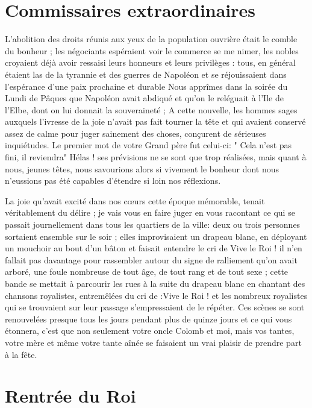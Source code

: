 \documentclass[11pt,a4paper]{report}
\begin{document}
\section*{Commissaires extraordinaires}

L'abolition des droits réunis aux yeux de la population ouvrière était le comble du bonheur ; les négociants espéraient voir le commerce se me nimer, les nobles croyaient déjà avoir ressaisi leurs honneurs et leurs privilèges : tous, en général étaient las de la tyrannie et des guerres de Napoléon et se réjouissaient dans l'espérance d'une paix prochaine et durable Nous apprîmes dans la soirée du Lundi de Pâques que Napoléon avait abdiqué et qu'on le reléguait à l'Ile de l'Elbe, dont on lui donnait la souveraineté ; A cette nouvelle, les hommes sages auxquels l'ivresse de la joie n'avait pas fait tourner la tête et qui avaient conservé assez de calme pour juger sainement des choses, conçurent de sérieuses inquiétudes. Le premier mot de votre Grand père fut celui-ci: " Cela n'est pas fini, il reviendra" Hélas ! ses prévisions ne se sont que trop réalisées, mais quant à nous, jeunes têtes, nous savourions alors si vivement le bonheur dont nous n'eussions pas été capables d'étendre si loin nos réflexions.

La joie qu'avait excité dans nos cœurs cette époque mémorable, tenait véritablement du délire ; je vais vous en faire juger en vous racontant ce qui se passait journellement dans tous les quartiers de la ville: deux ou trois personnes sortaient ensemble sur le soir ; elles improvisaient un drapeau blanc, en déployant un mouchoir au bout d'un bâton et faisait entendre le cri de Vive le Roi ! il n'en fallait pas davantage pour rassembler autour du signe de ralliement qu'on avait arboré, une foule nombreuse de tout âge, de tout rang et de tout sexe ; cette bande se mettait à parcourir les rues à la suite du drapeau blanc en chantant des chansons royalistes, entremêlées du cri de :Vive le Roi ! et les nombreux royalistes qui se trouvaient sur leur passage s'empressaient de le répéter. Ces scènes se sont renouvelées presque tous les jours pendant plus de quinze jours et ce qui vous étonnera, c'est que non seulement votre oncle Colomb et moi, mais vos tantes, votre mère et même votre tante aînée se faisaient un vrai plaisir de prendre part à la fête.

\section*{Rentrée du Roi}
\end{document}
